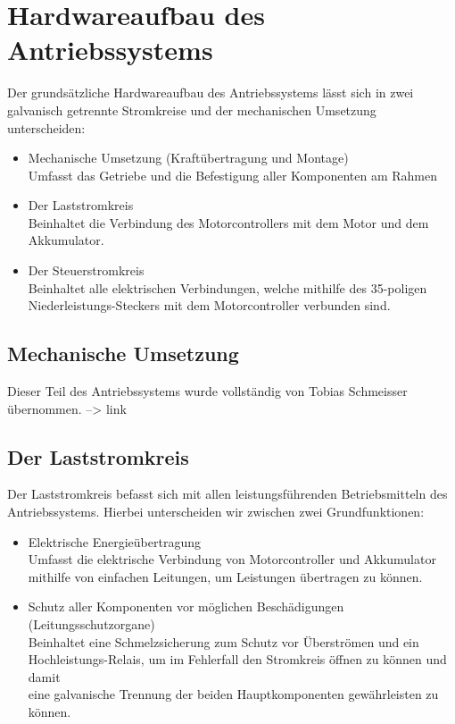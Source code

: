 \section{Hardwareaufbau des Antriebssystems}
Der grundsätzliche Hardwareaufbau des Antriebssystems lässt sich in zwei galvanisch getrennte Stromkreise und der mechanischen Umsetzung unterscheiden:

\begin{itemize}
	\item Mechanische Umsetzung (Kraftübertragung und Montage) 
	\\ Umfasst das Getriebe und die Befestigung aller Komponenten am Rahmen
	\item Der Laststromkreis
	\\ Beinhaltet die Verbindung des Motorcontrollers mit dem Motor und dem Akkumulator.
	\item Der Steuerstromkreis
	\\ Beinhaltet alle elektrischen Verbindungen, welche mithilfe des 35-poligen
	\\ Niederleistungs-Steckers mit dem Motorcontroller verbunden sind.
\end{itemize}

\newpage



\subsection{Mechanische Umsetzung}
Dieser Teil des Antriebssystems wurde vollständig von Tobias Schmeisser übernommen.
--> link

\newpage



\subsection{Der Laststromkreis}
Der Laststromkreis befasst sich mit allen leistungsführenden Betriebsmitteln des Antriebssystems. Hierbei unterscheiden wir zwischen zwei Grundfunktionen:

\begin{itemize}
	\item Elektrische Energieübertragung
	\\ Umfasst die elektrische Verbindung von Motorcontroller und Akkumulator 					\\ mithilfe von einfachen Leitungen, um Leistungen übertragen zu können.
	\item Schutz aller Komponenten vor möglichen Beschädigungen (Leitungsschutzorgane)
	\\ Beinhaltet eine Schmelzsicherung zum Schutz vor Überströmen und ein 						\\ Hochleistungs-Relais, um im Fehlerfall den Stromkreis öffnen zu können und damit  		\\ eine galvanische Trennung der beiden Hauptkomponenten gewährleisten zu können.
\end{itemize}

